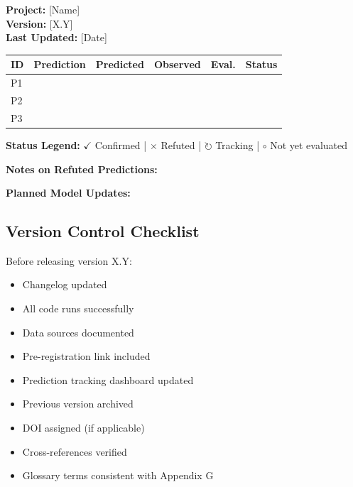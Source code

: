 \begin{tcolorbox}[colback=gray!5!white, colframe=gray!75!black,
    title=\textbf{EBF Prediction Tracking Dashboard}]

\textbf{Project:} [Name] \\
\textbf{Version:} [X.Y] \\
\textbf{Last Updated:} [Date]

\vspace{0.5em}

\begin{tabular}{@{}lccccl@{}}
\toprule
\textbf{ID} & \textbf{Prediction} & \textbf{Predicted} & \textbf{Observed} & \textbf{Eval.} & \textbf{Status} \\
\midrule
P1 & & & & & \\
P2 & & & & & \\
P3 & & & & & \\
\bottomrule
\end{tabular}

\vspace{0.5em}

\textbf{Status Legend:}
$\checkmark$ Confirmed |
$\times$ Refuted |
$\circlearrowright$ Tracking |
$\circ$ Not yet evaluated

\textbf{Notes on Refuted Predictions:}

\textbf{Planned Model Updates:}

\end{tcolorbox}

\subsection{Version Control Checklist}

\begin{tcolorbox}[colback=gray!5!white, colframe=gray!75!black,
    title=\textbf{EBF Version Release Checklist}]

Before releasing version X.Y:

\begin{itemize}
    \item[$\square$] Changelog updated
    \item[$\square$] All code runs successfully
    \item[$\square$] Data sources documented
    \item[$\square$] Pre-registration link included
    \item[$\square$] Prediction tracking dashboard updated
    \item[$\square$] Previous version archived
    \item[$\square$] DOI assigned (if applicable)
    \item[$\square$] Cross-references verified
    \item[$\square$] Glossary terms consistent with Appendix G
\end{itemize}

\end{tcolorbox}


